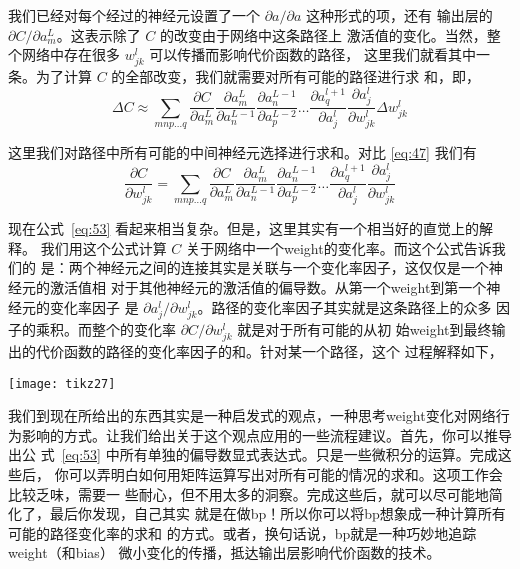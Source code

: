 我们已经对每个经过的神经元设置了一个 $\partial a/\partial a$ 这种形式的项，还有
输出层的 $\partial C/\partial a_m^L$。这表示除了 $C$ 的改变由于网络中这条路径上
激活值的变化。当然，整个网络中存在很多 $w_{jk}^l$ 可以传播而影响代价函数的路径，
这里我们就看其中一条。为了计算 $C$ 的全部改变，我们就需要对所有可能的路径进行求
和，即，
\begin{equation}
  \Delta C \approx \sum_{mnp\ldots q} \frac{\partial C}{\partial a^L_m}
  \frac{\partial a^L_m}{\partial a^{L-1}_n} \frac{\partial a^{L-1}_n}{\partial
    a^{L-2}_p} \ldots \frac{\partial a^{l+1}_q}{\partial a^l_j} \frac{\partial
    a^l_j}{\partial w^l_{jk}} \Delta w^l_{jk}
  \label{eq:52}\tag{52}
\end{equation}

这里我们对路径中所有可能的中间神经元选择进行求和。对比 \eqref{eq:47} 我们有
\begin{equation}
  \frac{\partial C}{\partial w^l_{jk}} = \sum_{mnp\ldots q} \frac{\partial
    C}{\partial a^L_m} \frac{\partial a^L_m}{\partial a^{L-1}_n} \frac{\partial
    a^{L-1}_n}{\partial a^{L-2}_p} \ldots \frac{\partial a^{l+1}_q}{\partial
    a^l_j} \frac{\partial a^l_j}{\partial w^l_{jk}}
\label{eq:53}\tag{53}
\end{equation}

现在公式~\eqref{eq:53} 看起来相当复杂。但是，这里其实有一个相当好的直觉上的解释。
我们用这个公式计算 $C$ 关于网络中一个\gls*{weight}的变化率。而这个公式告诉我们的
是：两个神经元之间的连接其实是关联与一个变化率因子，这仅仅是一个神经元的激活值相
对于其他神经元的激活值的偏导数。从第一个\gls*{weight}到第一个神经元的变化率因子
是 $\partial a_j^l/\partial w_{jk}^l$。路径的变化率因子其实就是这条路径上的众多
因子的乘积。而整个的变化率 $\partial C/\partial w_{jk}^l$ 就是对于所有可能的从初
始\gls*{weight}到最终输出的代价函数的路径的变化率因子的和。针对某一个路径，这个
过程解释如下，

\begin{center}
  \texttt{[image: tikz27]}
\end{center}

我们到现在所给出的东西其实是一种启发式的观点，一种思考\gls*{weight}变化对网络行
为影响的方式。让我们给出关于这个观点应用的一些流程建议。首先，你可以推导出公
式~\eqref{eq:53} 中所有单独的偏导数显式表达式。只是一些微积分的运算。完成这些后，
你可以弄明白如何用矩阵运算写出对所有可能的情况的求和。这项工作会比较乏味，需要一
些耐心，但不用太多的洞察。完成这些后，就可以尽可能地简化了，最后你发现，自己其实
就是在做\gls*{bp}！所以你可以将\gls*{bp}想象成一种计算所有可能的路径变化率的求和
的方式。或者，换句话说，\gls*{bp}就是一种巧妙地追踪\gls*{weight}（和\gls*{bias}）
微小变化的传播，抵达输出层影响代价函数的技术。

